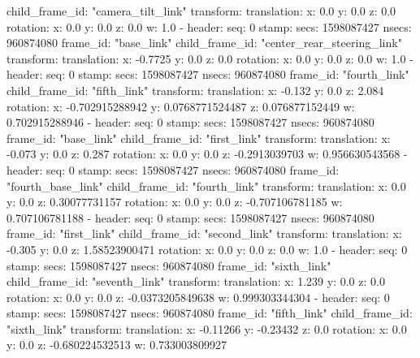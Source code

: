     child_frame_id: "camera_tilt_link"
    transform: 
      translation: 
        x: 0.0
        y: 0.0
        z: 0.0
      rotation: 
        x: 0.0
        y: 0.0
        z: 0.0
        w: 1.0
  - 
    header: 
      seq: 0
      stamp: 
        secs: 1598087427
        nsecs: 960874080
      frame_id: "base_link"
    child_frame_id: "center_rear_steering_link"
    transform: 
      translation: 
        x: -0.7725
        y: 0.0
        z: 0.0
      rotation: 
        x: 0.0
        y: 0.0
        z: 0.0
        w: 1.0
  - 
    header: 
      seq: 0
      stamp: 
        secs: 1598087427
        nsecs: 960874080
      frame_id: "fourth_link"
    child_frame_id: "fifth_link"
    transform: 
      translation: 
        x: -0.132
        y: 0.0
        z: 2.084
      rotation: 
        x: -0.702915288942
        y: 0.0768771524487
        z: 0.076877152449
        w: 0.702915288946
  - 
    header: 
      seq: 0
      stamp: 
        secs: 1598087427
        nsecs: 960874080
      frame_id: "base_link"
    child_frame_id: "first_link"
    transform: 
      translation: 
        x: -0.073
        y: 0.0
        z: 0.287
      rotation: 
        x: 0.0
        y: 0.0
        z: -0.2913039703
        w: 0.956630543568
  - 
    header: 
      seq: 0
      stamp: 
        secs: 1598087427
        nsecs: 960874080
      frame_id: "fourth_base_link"
    child_frame_id: "fourth_link"
    transform: 
      translation: 
        x: 0.0
        y: 0.0
        z: 0.30077731157
      rotation: 
        x: 0.0
        y: 0.0
        z: -0.707106781185
        w: 0.707106781188
  - 
    header: 
      seq: 0
      stamp: 
        secs: 1598087427
        nsecs: 960874080
      frame_id: "first_link"
    child_frame_id: "second_link"
    transform: 
      translation: 
        x: -0.305
        y: 0.0
        z: 1.58523900471
      rotation: 
        x: 0.0
        y: 0.0
        z: 0.0
        w: 1.0
  - 
    header: 
      seq: 0
      stamp: 
        secs: 1598087427
        nsecs: 960874080
      frame_id: "sixth_link"
    child_frame_id: "seventh_link"
    transform: 
      translation: 
        x: 1.239
        y: 0.0
        z: 0.0
      rotation: 
        x: 0.0
        y: 0.0
        z: -0.0373205849638
        w: 0.999303344304
  - 
    header: 
      seq: 0
      stamp: 
        secs: 1598087427
        nsecs: 960874080
      frame_id: "fifth_link"
    child_frame_id: "sixth_link"
    transform: 
      translation: 
        x: -0.11266
        y: -0.23432
        z: 0.0
      rotation: 
        x: 0.0
        y: 0.0
        z: -0.680224532513
        w: 0.733003809927
